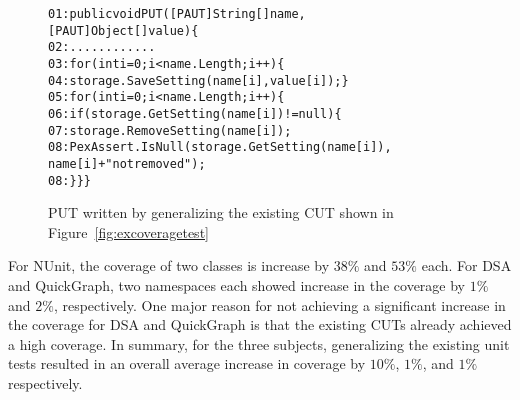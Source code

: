 \begin{figure}[t]
\begin{CodeOut}
\begin{alltt}
01: public void PUT([PAUT]String[] name, 
\hspace*{1.7in}[PAUT]Object[] value) \{
02: \hspace*{0.07in}............
03: \hspace*{0.07in}for (int i = 0; i < name.Length; i++) \{
04: \hspace*{0.22in}storage.SaveSetting(name[i], value[i]); \}
05: \hspace*{0.07in}for (int i = 0; i < name.Length; i++) \{
06: \hspace*{0.17in}if (storage.GetSetting(name[i]) != null) \{
07: \hspace*{0.3in}storage.RemoveSetting(name[i]);
08: \hspace*{0.3in}PexAssert.IsNull(storage.GetSetting(name[i]), 
\hspace*{1.5in}name[i] + " not removed"); 
08: \hspace*{0.1in}\}\}\}
\end{alltt}
\end{CodeOut} \vspace*{-2ex}
\caption{PUT written by generalizing the existing CUT shown in Figure~\ref{fig:excoveragetest}} \vspace*{-2ex}
\label{fig:excoveragePUT}%
\end{figure}

For NUnit, the coverage of two classes is increase by $38\%$ and $53\%$ each. For DSA and QuickGraph, two namespaces each showed increase in the coverage by $1\%$ and $2\%$, respectively. One major reason for not achieving a significant increase in the coverage for DSA and QuickGraph is that the existing CUTs already achieved a high coverage. In summary, for the three subjects, generalizing the existing unit tests resulted in an overall average increase in coverage by $10\%$, $1\%$, and $1\%$ respectively. 

